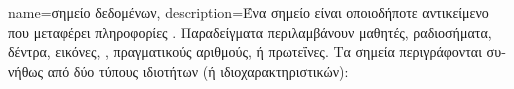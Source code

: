 {name={\foreignlanguage{greek}{σημείο δεδομένων}},
	description={\foreignlanguage{greek}{Ένα σημείο}  
		\foreignlanguage{greek}{είναι οποιοδήποτε αντικείμενο που μεταφέρει πληροφορίες} \cite{coverthomas}. 
		\foreignlanguage{greek}{Παραδείγματα περιλαμβάνουν μαθητές, ραδιοσήματα, δέντρα, εικόνες,} , 
		\foreignlanguage{greek}{πραγματικούς αριθ\-μούς, ή πρωτεΐνες. Τα σημεία}  
		\foreignlanguage{greek}{περιγράφονται συνήθως από δύο τύπους ιδιοτήτων (ή ιδιοχαρακτηριστικών):} 
}}
